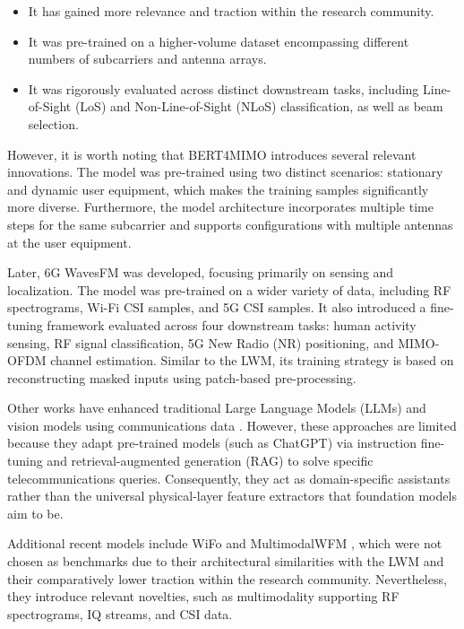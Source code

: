 \begin{itemize}
    \item It has gained more relevance and traction within the research community.
    \item It was pre-trained on a higher-volume dataset encompassing different numbers of subcarriers and antenna arrays.
    \item It was rigorously evaluated across distinct downstream tasks, including Line-of-Sight (LoS) and Non-Line-of-Sight (NLoS) classification, as well as beam selection.
\end{itemize}

However, it is worth noting that BERT4MIMO introduces several relevant innovations. The model was pre-trained using two distinct scenarios: stationary and dynamic user equipment, which makes the training samples significantly more diverse. Furthermore, the model architecture incorporates multiple time steps for the same subcarrier and supports configurations with multiple antennas at the user equipment.

Later, 6G WavesFM \cite{wavesfm} was developed, focusing primarily on sensing and localization. The model was pre-trained on a wider variety of data, including RF spectrograms, Wi-Fi CSI samples, and 5G CSI samples. It also introduced a fine-tuning framework evaluated across four downstream tasks: human activity sensing, RF signal classification, 5G New Radio (NR) positioning, and MIMO-OFDM channel estimation. Similar to the LWM, its training strategy is based on reconstructing masked inputs using patch-based pre-processing.

Other works have enhanced traditional Large Language Models (LLMs) and vision models using communications data \cite{Zhang_2026}. However, these approaches are limited because they adapt pre-trained models (such as ChatGPT) via instruction fine-tuning and retrieval-augmented generation (RAG) to solve specific telecommunications queries. Consequently, they act as domain-specific assistants rather than the universal physical-layer feature extractors that foundation models aim to be.

Additional recent models include WiFo \cite{Liu2025} and MultimodalWFM \cite{aboulfotouh2026multimodalwirelessfoundationmodels}, which were not chosen as benchmarks due to their architectural similarities with the LWM and their comparatively lower traction within the research community. Nevertheless, they introduce relevant novelties, such as multimodality supporting RF spectrograms, IQ streams, and CSI data.

